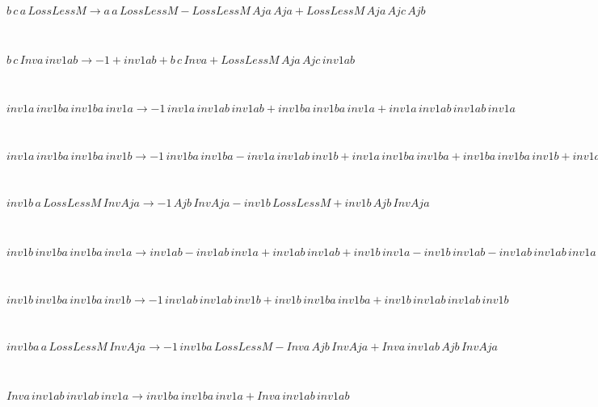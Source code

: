 \documentclass[rep10,leqno]{report}
\begin{document}
\begin{minipage}{6in}
$
b\,
 c\,
 a\,
 LossLessM\rightarrow a\,
 a\,
 LossLessM - LossLessM\,
 Aja\,
 Aja + LossLessM\,
 Aja\,
 Ajc\,
 Ajb
$
\end{minipage}\medskip \\
\begin{minipage}{6in}
$
b\,
 c\,
 Inva\,
 inv1ab\rightarrow -1 + inv1ab + b\,
 c\,
 Inva + LossLessM\,
 Aja\,
 Ajc\,
 inv1ab
$
\end{minipage}\medskip \\
\begin{minipage}{6in}
$
inv1a\,
 inv1ba\,
 inv1ba\,
 inv1a\rightarrow -1\,
 inv1a\,
 inv1ab\,
 inv1ab + inv1ba\,
 inv1ba\,
 inv1a + inv1a\,
 inv1ab\,
 inv1ab\,
 inv1a
$
\end{minipage}\medskip \\
\begin{minipage}{6in}
$
inv1a\,
 inv1ba\,
 inv1ba\,
 inv1b\rightarrow -1\,
 inv1ba\,
 inv1ba - inv1a\,
 inv1ab\,
 inv1b + inv1a\,
 inv1ba\,
 inv1ba + inv1ba\,
 inv1ba\,
 inv1b + inv1a\,
 inv1ab\,
 inv1ab\,
 inv1b
$
\end{minipage}\medskip \\
\begin{minipage}{6in}
$
inv1b\,
 a\,
 LossLessM\,
 InvAja\rightarrow -1\,
 Ajb\,
 InvAja - inv1b\,
 LossLessM + inv1b\,
 Ajb\,
 InvAja
$
\end{minipage}\medskip \\
\begin{minipage}{6in}
$
inv1b\,
 inv1ba\,
 inv1ba\,
 inv1a\rightarrow inv1ab - inv1ab\,
 inv1a + inv1ab\,
 inv1ab + inv1b\,
 inv1a - inv1b\,
 inv1ab - inv1ab\,
 inv1ab\,
 inv1a + inv1b\,
 inv1ab\,
 inv1a - inv1b\,
 inv1ab\,
 inv1ab + inv1b\,
 inv1ab\,
 inv1ab\,
 inv1a
$
\end{minipage}\medskip \\
\begin{minipage}{6in}
$
inv1b\,
 inv1ba\,
 inv1ba\,
 inv1b\rightarrow -1\,
 inv1ab\,
 inv1ab\,
 inv1b + inv1b\,
 inv1ba\,
 inv1ba + inv1b\,
 inv1ab\,
 inv1ab\,
 inv1b
$
\end{minipage}\medskip \\
\begin{minipage}{6in}
$
inv1ba\,
 a\,
 LossLessM\,
 InvAja\rightarrow -1\,
 inv1ba\,
 LossLessM - Inva\,
 Ajb\,
 InvAja + Inva\,
 inv1ab\,
 Ajb\,
 InvAja
$
\end{minipage}\medskip \\
\begin{minipage}{6in}
$
Inva\,
 inv1ab\,
 inv1ab\,
 inv1a\rightarrow inv1ba\,
 inv1ba\,
 inv1a + Inva\,
 inv1ab\,
 inv1ab
$
\end{minipage}\medskip \\
\end{document}
